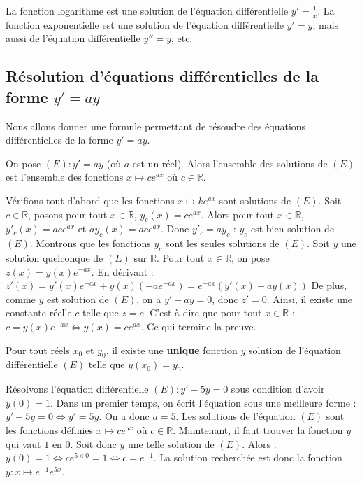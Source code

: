 	\begin{tip}[Exemple]
		La fonction logarithme est une solution de l'équation différentielle $y' = \frac{1}{x}$.
		\newpar
		La fonction exponentielle est une solution de l'équation différentielle $y' = y$, mais aussi de l'équation différentielle $y'' = y$, etc.
	\end{tip}
	
	\subsection{Résolution d'équations différentielles de la forme $y'=ay$}
	
	Nous allons donner une formule permettant de résoudre des équations différentielles de la forme $y' = ay$.
	
	\begin{formula}[Formule]
		On pose $(E) : y'=ay$ (où $a$ est un réel). Alors l'ensemble des solutions de $(E)$ est l'ensemble des fonctions $x \mapsto c e^{ax}$ où $c \in \mathbb{R}$.
	\end{formula}
	
	\begin{demonstration}
		Vérifions tout d'abord que les fonctions $x \mapsto k e^{ax}$ sont solutions de $(E)$. Soit $c \in \mathbb{R}$, posons pour tout $x \in \mathbb{R}$, $y_c(x) = c e^{ax}$.
		\newpar
		Alors pour tout $x \in \mathbb{R}$, $y'_c(x) = ac e^{ax}$ et $ay_c(x) = ac e^{ax}$. Donc $y'_c = a y_c$ : $y_c$ est bien solution de $(E)$.
		\newpar
		Montrons que les fonctions $y_c$ sont les seules solutions de $(E)$. Soit $y$ une solution quelconque de $(E)$ sur $\mathbb{R}$. Pour tout $x \in \mathbb{R}$, on pose $z(x) = y(x) e^{-ax}$. En dérivant :
		\newpar
		$z'(x) = y'(x) e^{-ax} + y(x) (-ae^{-ax}) = e^{-ax}(y'(x) - ay(x))$
		\newpar
		De plus, comme $y$ est solution de $(E)$, on a $y' - ay = 0$, donc $z' = 0$.
		\newpar
		Ainsi, il existe une constante réelle $c$ telle que $z = c$. C'est-à-dire que pour tout $x \in \mathbb{R}$ :
		\newpar
		$c = y(x) e^{-ax} \iff y(x) = c e^{ax}$. Ce qui termine la preuve.
	\end{demonstration}
	
	\begin{formula}[Théorème]
		Pour tout réels $x_0$ et $y_0$, il existe une \textbf{unique} fonction $y$ solution de l'équation différentielle $(E)$ telle que $y(x_0) = y_0$.
	\end{formula}
	
	\begin{tip}[Exemple]
		Résolvons l'équation différentielle $(E) : y' - 5y = 0$ sous condition d'avoir $y(0) = 1$.
		\newpar
		Dans un premier temps, on écrit l'équation sous une meilleure forme : $y' - 5y = 0 \iff y' = 5y$. On a donc $a = 5$. Les solutions de l'équation $(E)$ sont les fonctions définies $x \mapsto c e^{5x}$ où $c \in \mathbb{R}$.
		\newpar
		Maintenant, il faut trouver la fonction $y$ qui vaut $1$ en $0$. Soit donc $y$ une telle solution de $(E)$. Alors :
		\newpar
		$y(0) = 1 \iff c e^{5 \times 0} = 1 \iff c = e^{-1}$. La solution recherchée est donc la fonction $y : x \mapsto e^{-1} e^{5x}$.
	\end{tip}
	
